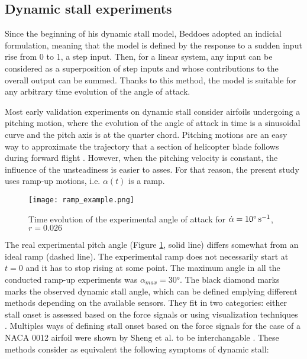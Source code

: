 \subsection{Dynamic stall experiments}

Since the beginning of his dynamic stall model, Beddoes adopted an indicial formulation, meaning that the model is defined by the response to a sudden input rise from 0 to 1, a step input. Then, for a linear system, any input can be considered as a superposition of step inputs and whose contributions to the overall output can be summed. Thanks to this method, the model is suitable for any arbitrary time evolution of the angle of attack.

Most early validation experiments on dynamic stall consider airfoils undergoing a pitching motion, where the evolution of the angle of attack in time is a sinusoidal curve and the pitch axis is at the quarter chord. 
Pitching motions are an easy way to approximate the trajectory that a section of helicopter blade follows during forward flight \cite{mccroskey_dynamic_1972,mulleners_coherent_2010}. 
However, when the pitching velocity is constant, the influence of the unsteadiness is easier to asses. For that reason, the present study uses ramp-up motions, i.e. $\alpha(t)$ is a ramp.

\begin{figure}[h]
	\centering
	\texttt{[image: ramp\_example.png]}
	\caption{Time evolution of the experimental angle of attack for $\dot{\alpha}=10\si{\degree \per \second}$, $r=0.026$}
	\label{fig:ramp_example}
\end{figure}

The real experimental pitch angle (Figure \ref{fig:ramp_example}, solid line) differs somewhat from an ideal ramp (dashed line). The experimental ramp does not necessarily start at $t=0$ and it has to stop rising at some point. The maximum angle in all the conducted ramp-up experiments was $\alpha_{max}=\ang{30}$. The black diamond marks marks the observed dynamic stall angle, which can be defined emplying different methods depending on the available sensors.  They fit in two categories: either stall onset is assessed based on the force signals \cite{sheng_new_2006} or using visualization techniques \cite{mulleners_coherent_2010}.
Multiples ways of defining stall onset based on the force signals for the case of a NACA 0012 airfoil were shown by Sheng et al. \cite{sheng_new_2006} to be interchangable . These methods consider as equivalent the following symptoms of dynamic stall: 

